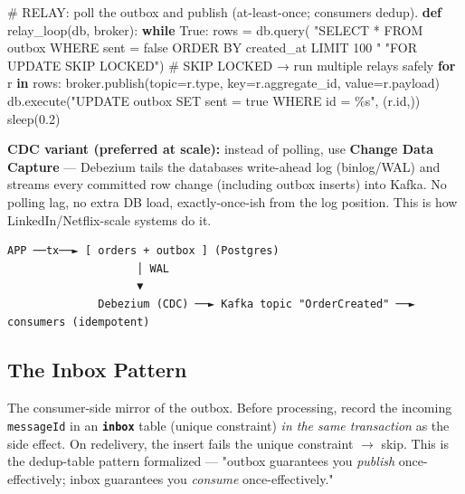 \documentclass[11pt]{article}
\newenvironment{Shaded}{\begin{snugshade}}{\end{snugshade}}
\newcommand{\BuiltInTok}[1]{\textcolor[rgb]{0.50,0.55,0.55}{#1}}
\newcommand{\CommentTok}[1]{\textcolor[rgb]{0.48,0.49,0.49}{#1}}
\newcommand{\ControlFlowTok}[1]{\textcolor[rgb]{0.99,0.74,0.29}{\textbf{#1}}}
\newcommand{\FloatTok}[1]{\textcolor[rgb]{0.96,0.45,0.00}{#1}}
\newcommand{\KeywordTok}[1]{\textcolor[rgb]{0.81,0.81,0.76}{\textbf{#1}}}
\newcommand{\NormalTok}[1]{\textcolor[rgb]{0.81,0.81,0.76}{#1}}
\newcommand{\OperatorTok}[1]{\textcolor[rgb]{0.81,0.81,0.76}{#1}}
\newcommand{\SpecialCharTok}[1]{\textcolor[rgb]{0.24,0.68,0.91}{#1}}
\newcommand{\StringTok}[1]{\textcolor[rgb]{0.96,0.31,0.31}{#1}}
\newcommand{\VariableTok}[1]{\textcolor[rgb]{0.15,0.68,0.68}{#1}}
\begin{document}
\begin{Shaded}
\begin{Highlighting}[]
\CommentTok{\# RELAY: poll the outbox and publish (at{-}least{-}once; consumers dedup).}
\KeywordTok{def}\NormalTok{ relay\_loop(db, broker):}
    \ControlFlowTok{while} \VariableTok{True}\NormalTok{:}
\NormalTok{        rows }\OperatorTok{=}\NormalTok{ db.query(}
            \StringTok{"SELECT * FROM outbox WHERE sent = false ORDER BY created\_at LIMIT 100 "}
            \StringTok{"FOR UPDATE SKIP LOCKED"}\NormalTok{)            }\CommentTok{\# SKIP LOCKED → run multiple relays safely}
        \ControlFlowTok{for}\NormalTok{ r }\KeywordTok{in}\NormalTok{ rows:}
\NormalTok{            broker.publish(topic}\OperatorTok{=}\NormalTok{r.}\BuiltInTok{type}\NormalTok{, key}\OperatorTok{=}\NormalTok{r.aggregate\_id, value}\OperatorTok{=}\NormalTok{r.payload)}
\NormalTok{            db.execute(}\StringTok{"UPDATE outbox SET sent = true WHERE id = }\SpecialCharTok{\%s}\StringTok{"}\NormalTok{, (r.}\BuiltInTok{id}\NormalTok{,))}
\NormalTok{        sleep(}\FloatTok{0.2}\NormalTok{)}
\end{Highlighting}
\end{Shaded}

\textbf{CDC variant (preferred at scale):} instead of polling, use \textbf{Change Data Capture} --- Debezium tails the database\textquotesingle s write-ahead log (binlog/WAL) and streams every committed row change (including outbox inserts) into Kafka. No polling lag, no extra DB load, exactly-once-ish from the log position. This is how LinkedIn/Netflix-scale systems do it.

\setcodelang{}

\begin{verbatim}
APP ──tx──► [ orders + outbox ] (Postgres)
                    │ WAL
                    ▼
              Debezium (CDC) ──► Kafka topic "OrderCreated" ──► consumers (idempotent)
\end{verbatim}

\subsection{The Inbox Pattern}\label{the-inbox-pattern}

The consumer-side mirror of the outbox. Before processing, record the incoming \texttt{messageId} in an \textbf{\texttt{inbox}} table (unique constraint) \emph{in the same transaction} as the side effect. On redelivery, the insert fails the unique constraint \(\rightarrow\) skip. This is the dedup-table pattern formalized --- "outbox guarantees you \emph{publish} once-effectively; inbox guarantees you \emph{consume} once-effectively."
\end{document}
